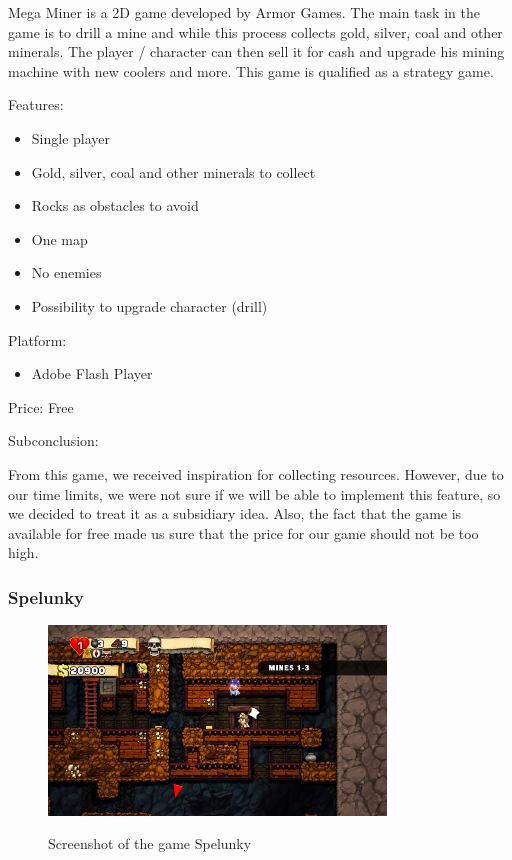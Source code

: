 \documentclass[12p]{article}
\begin{document}
Mega Miner is a 2D game developed by Armor Games. The main task in the game is to drill a mine and while this process collects gold, silver, coal and other minerals. The player / character can then sell it for cash and upgrade his mining machine with new coolers and more. This game is qualified as a strategy game.

Features:

\begin{itemize}
  \item Single player
  \item Gold, silver, coal and other minerals to collect
  \item Rocks as obstacles to avoid
  \item One map
  \item No enemies
  \item Possibility to upgrade character (drill)
\end{itemize}

Platform: 

\begin{itemize}
    \item Adobe Flash Player
\end{itemize}

Price: Free

Subconclusion:

From this game, we received inspiration for collecting resources. However, due to our time limits, we were not sure if we will be able to implement this feature, so we decided to treat it as a subsidiary idea. Also, the fact that the game is available for free made us sure that the price for our game should not be too high.



\newpage
\subsubsection[Spelunky]{Spelunky \cite{Spelunky}}

\begin{figure}[ht]
  \center
  \includegraphics[width=0.8\textwidth]{StateOfTheArtScreenshots/spelunky}
  \label{sec:StateOfTheArt_Screenshots_Spelunky}
  \caption{Screenshot of the game Spelunky \cite{SpelunkyScreenshot}}
\end{figure}
\end{document}
